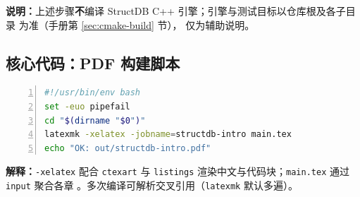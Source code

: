 \noindent\textbf{说明：}上述步骤\textbf{不}编译 StructDB C++ 引擎；引擎与测试目标以仓库根及各子目录  为准（手册第 \ref{sec:cmake-build} 节）， 仅为辅助说明。

\subsection{核心代码：PDF 构建脚本}

\begin{lstlisting}[language=bash, numbers=left, firstnumber=1]
#!/usr/bin/env bash
set -euo pipefail
cd "$(dirname "$0")"
latexmk -xelatex -jobname=structdb-intro main.tex
echo "OK: out/structdb-intro.pdf"
\end{lstlisting}

\textbf{解释：}\texttt{-xelatex} 配合 \texttt{ctexart} 与 \texttt{listings} 渲染中文与代码块；\texttt{main.tex} 通过 \texttt{input} 聚合各章 。多次编译可解析交叉引用（\texttt{latexmk} 默认多遍）。
